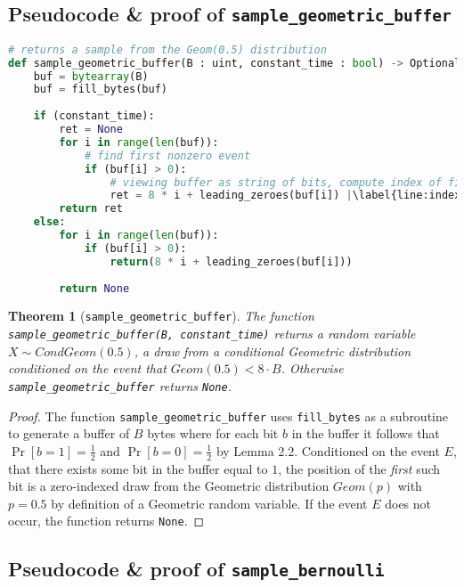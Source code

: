 \documentclass[11pt,a4paper]{article}
\newtheorem{theorem}{Theorem}[section]
\theoremstyle{definition}
\begin{document}
\subsection{Pseudocode \& proof of \texttt{sample\_geometric\_buffer}}
\begin{lstlisting}[language=Python, escapechar=|]
# returns a sample from the Geom(0.5) distribution
def sample_geometric_buffer(B : uint, constant_time : bool) -> Optional[uint]: |\label{line:geombuffer}|
    buf = bytearray(B)
    buf = fill_bytes(buf)
    
    if (constant_time): 
        ret = None
        for i in range(len(buf)):
            # find first nonzero event
            if (buf[i] > 0):
                # viewing buffer as string of bits, compute index of first nonzero bit
                ret = 8 * i + leading_zeroes(buf[i]) |\label{line:indexcmp}|
        return ret
    else:
        for i in range(len(buf)):
            if (buf[i] > 0):
                return(8 * i + leading_zeroes(buf[i]))
        
        return None
\end{lstlisting}

\begin{tcolorbox}
\begin{theorem}[\texttt{sample\_geometric\_buffer}]
The function \texttt{sample\_geometric\_buffer(B, constant\_time)} returns a random variable $X \sim CondGeom(0.5)$, a draw from a conditional Geometric distribution conditioned on the event that $Geom(0.5) < 8 \cdot B$. Otherwise \texttt{sample\_geometric\_buffer} returns \texttt{None}. 
\end{theorem}
\end{tcolorbox}

\begin{proof}
The function \texttt{sample\_geometric\_buffer} uses \texttt{fill\_bytes}  as a subroutine to generate a buffer of $B$ bytes where for each bit $b$ in the buffer it follows that $\Pr[b = 1] = \frac{1}{2}$ and $\Pr[b = 0] = \frac{1}{2}$ by Lemma 2.2. Conditioned on the event $E$, that there exists some bit in the buffer equal to $1$, the position of the \emph{first} such bit is a zero-indexed draw from the Geometric distribution $Geom(p)$ with $p = 0.5$ by definition of a Geometric random variable. If the event $E$ does not occur, the function returns \texttt{None}. 
\end{proof}

\subsection{Pseudocode \& proof of \texttt{sample\_bernoulli}}
\end{document}

